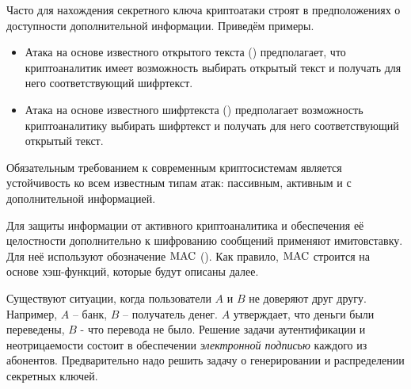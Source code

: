 Часто для нахождения секретного ключа криптоатаки строят в предположениях о доступности дополнительной информации. Приведём примеры.
\begin{itemize}
    \item Атака на основе известного открытого текста () предполагает, что криптоаналитик имеет возможность выбирать открытый текст и получать для него соответствующий шифртекст.
    \item Атака на основе известного шифртекста () предполагает возможность криптоаналитику выбирать шифртекст и получать для него соответствующий открытый текст.
\end{itemize}

Обязательным требованием к современным криптосистемам является устойчивость ко всем известным типам атак: пассивным, активным и с дополнительной информацией.


%

Для защиты информации от активного криптоаналитика и обеспечения её целостности дополнительно к шифрованию сообщений применяют имитовставку. Для неё используют обозначение $\textrm{MAC}$ (). Как правило, $\textrm{MAC}$ строится на основе хэш-функций, которые будут описаны далее.

Существуют ситуации, когда пользователи $A$ и $B$ не доверяют друг другу. Например, $A$ -- банк, $B$ -- получатель денег. $A$ утверждает, что деньги были переведены, $B$ - что перевода не было. Решение задачи аутентификации и неотрицаемости состоит в обеспечении \emph{электронной подписью} каждого из абонентов. Предварительно надо решить задачу о генерировании и распределении секретных ключей.


